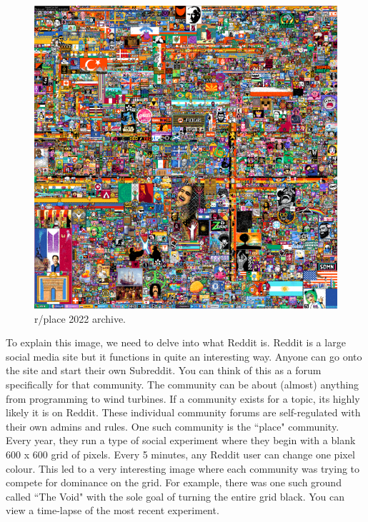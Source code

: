 \documentclass[a4paper,12pt]{article}
\begin{document}
	\begin{figure}[h]
		\centering
		\includegraphics*[scale = 0.5]{r_place.png}
		\caption{r/place 2022 archive.}
		\label{fig:r_place}
	\end{figure}
	
	To explain this image, we need to delve into what Reddit is. Reddit is a large social media site but it functions in quite an interesting way. Anyone can go onto the site and start their own Subreddit. You can think of this as a forum specifically for that community. The community can be about (almost) anything from programming to wind turbines. If a community exists for a topic, its highly likely it is on Reddit. These individual community forums are self-regulated with their own admins and rules. One such community is the ``place" community. Every year, they run a type of social experiment where they begin with a blank 600 x 600 grid of pixels. Every 5 minutes, any Reddit user can change one pixel colour. This led to a very interesting image where each community was trying to compete for dominance on the grid. For example, there was one such ground called ``The Void" with the sole goal of turning the entire grid black. You can view a time-lapse of the most recent experiment. 
	
\end{document}
